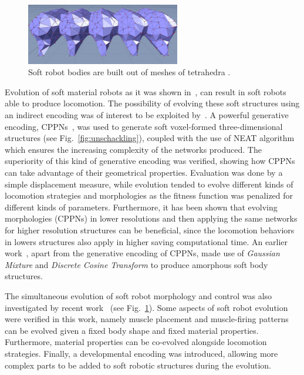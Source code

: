 \begin{figure}[b!]
\centering
\includegraphics[width=0.6\textwidth]{../Figures/Misc/meshSoft1.png}
\caption{Soft robot bodies are built out of meshes of tetrahedra \citep{rieffel2014growing}.}
\label{fig:meshSoft}
\end{figure}

Evolution of soft material robots as it was shown in~\citep{hiller2012automatic}, can result in soft robots able to produce locomotion. The possibility of evolving these soft structures using an indirect encoding was of interest to be exploited by~\citep{cheney2013unshackling}. A powerful generative encoding, CPPNs~\citep{stanley2007compositional}, was used to generate soft voxel-formed three-dimensional structures (see Fig.~\ref{fig:unschackling}), coupled with the use of NEAT algorithm which ensures the increasing complexity of the networks produced. The superiority of this kind of generative encoding was verified, showing how CPPNs can take advantage of their geometrical properties. Evaluation was done by a simple displacement measure, while evolution tended to evolve different kinds of locomotion strategies and morphologies as the fitness function was penalized for different kinds of parameters. Furthermore, it has been shown that evolving morphologies (CPPNs) in lower resolutions and then applying the same networks for higher resolution structures can be beneficial, since the locomotion behaviors in lowers structures also apply in higher saving computational time. An earlier work~\citep{hiller2010evolving}, apart from the generative encoding of CPPNs, made use of \textit{Gaussian Mixture} and \textit{Discrete Cosine Transform} to produce amorphous soft body structures.

The simultaneous evolution of soft robot morphology and control was also investigated by recent work~\citep{rieffel2014growing} (see Fig.~\ref{fig:meshSoft}). Some aspects of soft robot evolution were verified in this work, namely muscle placement and muscle-firing patterns can be evolved given a fixed body shape and fixed material properties. Furthermore, material properties can be co-evolved alongside locomotion strategies. Finally, a developmental encoding was introduced, allowing more complex parts to be added to soft robotic structures during the evolution.


